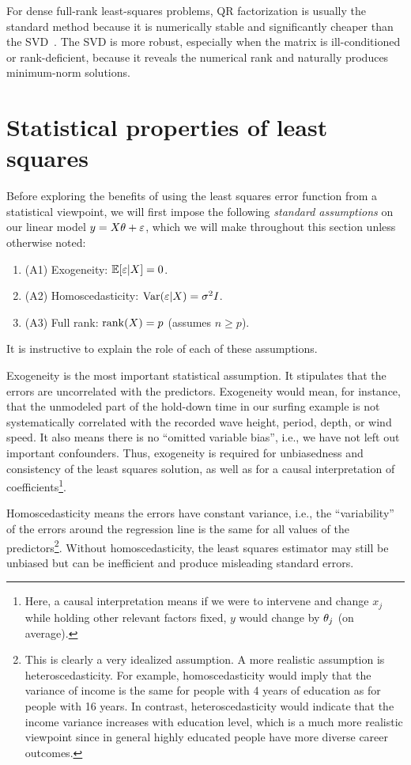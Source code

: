 For dense full-rank least-squares problems, QR factorization is usually the standard method because it is numerically stable and significantly cheaper than the SVD~\cite{Golub_MatrixComputations}. The SVD is more robust, especially when the matrix is ill-conditioned or rank-deficient, because it reveals the numerical rank and naturally produces minimum-norm solutions.








\section{Statistical properties of least squares}

Before exploring the benefits of using the least squares error function from a statistical viewpoint, we will first impose the following {\em standard assumptions} on our linear model $y= X\theta+\varepsilon$, which we will make throughout this section unless otherwise noted:


\begin{enumerate}
\item[] (A1) Exogeneity: $\mathbb{E}[\varepsilon | X] = 0$.
\item[] (A2) Homoscedasticity: $\operatorname{Var}(\varepsilon | X) = \sigma^2 I$.
\item[] (A3) Full rank: $\operatorname{rank}(X) = p$ (assumes $n \geq p$).
\end{enumerate}

It is instructive to explain the role of each of these assumptions.

Exogeneity is the most important statistical assumption. 
It stipulates that the errors are uncorrelated with the predictors.
Exogeneity would mean, for instance, that the unmodeled part of the hold-down time in our surfing example is not systematically correlated with the recorded wave height, period, depth, or wind speed.
It also means there is no ``omitted variable bias'', i.e., we have not left out important confounders. Thus, exogeneity is required for unbiasedness and consistency of the least squares solution, as well as for a causal interpretation of coefficients\footnote{Here, a causal interpretation 
means if we were to intervene and change $x_j$ 
while holding other relevant factors fixed, $y$
would change by $\theta_j$ (on average).}.


Homoscedasticity means the errors have constant variance, i.e.,  the  ``variability'' of the errors around  the regression line is the same for all values of the predictors\footnote{This is clearly a very idealized assumption. A more realistic assumption is heteroscedasticity. For example, homoscedasticity would imply that the variance of income is the same for people with 4 years of education as for people with 16 years. In contrast, heteroscedasticity would indicate that the income variance increases with education level, which is a much more realistic viewpoint since in general highly educated people have more diverse career outcomes.}.
Without homoscedasticity, the least squares estimator may still be unbiased but can be inefficient and produce misleading standard errors.

